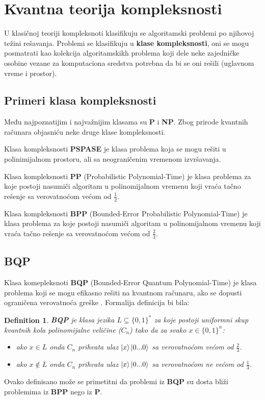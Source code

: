 \documentclass[12pt, letterpaper, oneside]{article}
\newtheorem{definition}{Definition}
\begin{document}
\section{Kvantna teorija kompleksnosti}
U klasičnoj teoriji kompleksnoti klasifikuju se algoritamski problemi po njihovoj težini rešavanja.
Problemi se klasifikuju u \textbf{klase kompleksnosti}, oni se mogu posmatrati kao kolekcija algoritamskikh problema koji dele neke zajedničke osobine
vezane za komputaciona sredstva potrebna da bi se oni rešili (uglavnom vreme i prostor). \cite{nielsen_chuang_10th}\\

\subsection{Primeri klasa kompleksnosti}
Među najpoznatijim i najvažnijim klasama su \textbf{P} i \textbf{NP}. Zbog prirode kvantnih računara objasniću neke druge klase kompleksnosti.

Klasa kompleksnosti \textbf{PSPASE} je klasa problema koja se mogu rešiti u polinimijalnom prostoru, ali sa neograničenim vremenom izvršavanja.


Klasa kompleksnosti \textbf{PP} (Probabilistic Polynomial-Time) je klasa problema za koje postoji nasumiči algoritam u polinomijalnom vremenu koji vraća
tačno rešenje sa verovatnoćom većom od $\frac{1}{2}$.

Klasa kompleksnosti \textbf{BPP} (Bounded-Error Probabilistic Polynomial-Time) je klasa problema za koje postoji nasumiči algoritam u polinomijalnom vremenu koji vraća
tačno rešenje sa verovatnoćom većom od $\frac{2}{3}$. \cite{aaronson2013quantum}
\subsection{BQP}
Klasa komepleksnoti \textbf{BQP} (Bounded-Error Quantum Polynomial-Time) je klasa problema koji se mogu efikasno rešiti na kvantnom računaru, ako se dopusti ograničena verovatnoća greške \cite{nielsen_chuang_10th}.
Formalija definicija bi bila:\cite{aaronson2013quantum}
\begin{definition}
    \textbf{BQP} je klasa jezika $L \subseteq \{0,1\}^{*}$ za koje postoji uniformni skup kvantnih kola polinomijalne veličine ($C_n$)
    tako da za svako $x \in \{0,1\}^{n}$:
    \begin{itemize}
        \item ako $x \in L$ onda $C_n$ prihvata ulaz $\Ket{x}\Ket{0...0}$ sa verovatnoćom većom od $\frac{2}{3}$.
        \item ako $x \notin L$ onda $C_n$ prihvata ulaz $\Ket{x}\Ket{0...0}$ sa verovatnoćom ne većom od $\frac{1}{3}$.
    \end{itemize} 
\end{definition}
Ovako definisano može se primetitni da problemi iz \textbf{BQP} su dosta bliži problemima iz \textbf{BPP} nego iz \textbf{P}.
\end{document}
